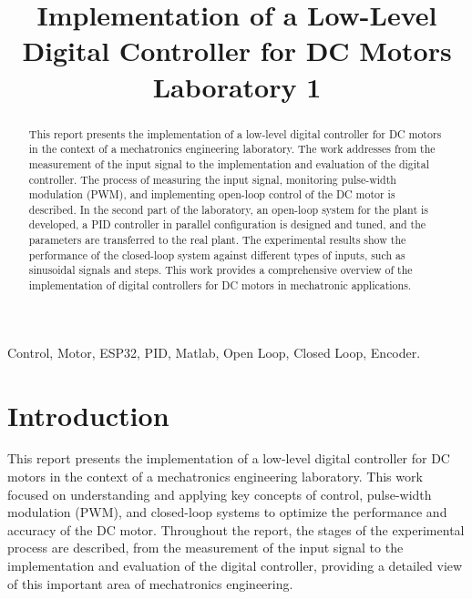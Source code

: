 \documentclass[conference,onecolumn]{IEEEtran}
\begin{document}
\title{Implementation of a Low-Level Digital Controller for DC Motors\\
{\footnotesize Laboratory 1}}

\author{
}

\maketitle
\justifying 

\begin{abstract}
This report presents the implementation of a low-level digital controller for DC motors in the context of a mechatronics engineering laboratory. The work addresses from the measurement of the input signal to the implementation and evaluation of the digital controller. The process of measuring the input signal, monitoring pulse-width modulation (PWM), and implementing open-loop control of the DC motor is described. In the second part of the laboratory, an open-loop system for the plant is developed, a PID controller in parallel configuration is designed and tuned, and the parameters are transferred to the real plant. The experimental results show the performance of the closed-loop system against different types of inputs, such as sinusoidal signals and steps. This work provides a comprehensive overview of the implementation of digital controllers for DC motors in mechatronic applications.

\end{abstract}

\begin{IEEEkeywords}
Control, Motor, ESP32, PID, Matlab, Open Loop, Closed Loop, Encoder.
\end{IEEEkeywords}

\section{Introduction}
This report presents the implementation of a low-level digital controller for DC motors in the context of a mechatronics engineering laboratory. This work focused on understanding and applying key concepts of control, pulse-width modulation (PWM), and closed-loop systems to optimize the performance and accuracy of the DC motor. Throughout the report, the stages of the experimental process are described, from the measurement of the input signal to the implementation and evaluation of the digital controller, providing a detailed view of this important area of mechatronics engineering.
\end{document}
